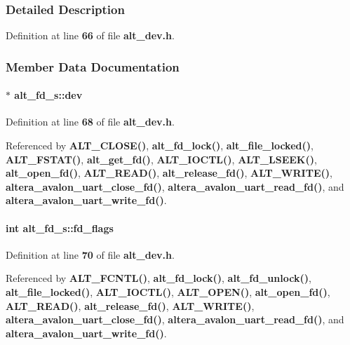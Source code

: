 \subsubsection{Detailed Description}


Definition at line {\bf 66} of file {\bf alt\+\_\+dev.\+h}.



\subsubsection{Member Data Documentation}
\paragraph[{dev}]{$\ast$ alt\+\_\+fd\+\_\+s\+::dev}\label{structalt__fd__s_aedf59decc86bd2746ac32e469df82d30}


Definition at line {\bf 68} of file {\bf alt\+\_\+dev.\+h}.



Referenced by {\bf A\+L\+T\+\_\+\+C\+L\+O\+S\+E()}, {\bf alt\+\_\+fd\+\_\+lock()}, {\bf alt\+\_\+file\+\_\+locked()}, {\bf A\+L\+T\+\_\+\+F\+S\+T\+A\+T()}, {\bf alt\+\_\+get\+\_\+fd()}, {\bf A\+L\+T\+\_\+\+I\+O\+C\+T\+L()}, {\bf A\+L\+T\+\_\+\+L\+S\+E\+E\+K()}, {\bf alt\+\_\+open\+\_\+fd()}, {\bf A\+L\+T\+\_\+\+R\+E\+A\+D()}, {\bf alt\+\_\+release\+\_\+fd()}, {\bf A\+L\+T\+\_\+\+W\+R\+I\+T\+E()}, {\bf altera\+\_\+avalon\+\_\+uart\+\_\+close\+\_\+fd()}, {\bf altera\+\_\+avalon\+\_\+uart\+\_\+read\+\_\+fd()}, and {\bf altera\+\_\+avalon\+\_\+uart\+\_\+write\+\_\+fd()}.

\paragraph[{fd\+\_\+flags}]{\setlength{\rightskip}{0pt plus 5cm}int alt\+\_\+fd\+\_\+s\+::fd\+\_\+flags}\label{structalt__fd__s_a80d54f9e067558dd3422de0143b925aa}


Definition at line {\bf 70} of file {\bf alt\+\_\+dev.\+h}.



Referenced by {\bf A\+L\+T\+\_\+\+F\+C\+N\+T\+L()}, {\bf alt\+\_\+fd\+\_\+lock()}, {\bf alt\+\_\+fd\+\_\+unlock()}, {\bf alt\+\_\+file\+\_\+locked()}, {\bf A\+L\+T\+\_\+\+I\+O\+C\+T\+L()}, {\bf A\+L\+T\+\_\+\+O\+P\+E\+N()}, {\bf alt\+\_\+open\+\_\+fd()}, {\bf A\+L\+T\+\_\+\+R\+E\+A\+D()}, {\bf alt\+\_\+release\+\_\+fd()}, {\bf A\+L\+T\+\_\+\+W\+R\+I\+T\+E()}, {\bf altera\+\_\+avalon\+\_\+uart\+\_\+close\+\_\+fd()}, {\bf altera\+\_\+avalon\+\_\+uart\+\_\+read\+\_\+fd()}, and {\bf altera\+\_\+avalon\+\_\+uart\+\_\+write\+\_\+fd()}.

